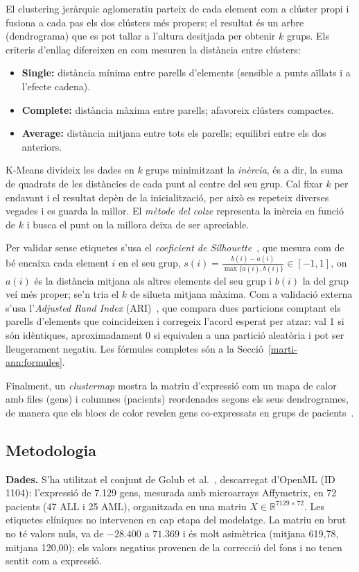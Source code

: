 \documentclass[a4paper,11pt]{article}
\begin{document}
El clustering jeràrquic aglomeratiu parteix de cada element com a clúster propi i fusiona a cada pas els dos clústers més propers; el resultat és un arbre (dendrograma) que es pot tallar a l'altura desitjada per obtenir $k$ grups. Els criteris d'enllaç difereixen en com mesuren la distància entre clústers:
\begin{itemize}
  \item \textbf{Single:} distància mínima entre parells d'elements (sensible a punts aïllats i a l'efecte cadena).
  \item \textbf{Complete:} distància màxima entre parells; afavoreix clústers compactes.
  \item \textbf{Average:} distància mitjana entre tots els parells; equilibri entre els dos anteriors.
\end{itemize}
K-Means divideix les dades en $k$ grups minimitzant la \emph{inèrcia}, és a dir, la suma de quadrats de les distàncies de cada punt al centre del seu grup. Cal fixar $k$ per endavant i el resultat depèn de la inicialització, per això es repeteix diverses vegades i es guarda la millor. El \emph{mètode del colze} representa la inèrcia en funció de $k$ i busca el punt on la millora deixa de ser apreciable.

Per validar sense etiquetes s'usa el \emph{coeficient de Silhouette}~\cite{rousseeuw}, que mesura com de bé encaixa cada element $i$ en el seu grup, $s(i)=\frac{b(i)-a(i)}{\max\{a(i),b(i)\}}\in[-1,1]$, on $a(i)$ és la distància mitjana als altres elements del seu grup i $b(i)$ la del grup veí més proper; se'n tria el $k$ de silueta mitjana màxima. Com a validació externa s'usa l'\emph{Adjusted Rand Index} (ARI)~\cite{hubert}, que compara dues particions comptant els parells d'elements que coincideixen i corregeix l'acord esperat per atzar: val 1 si són idèntiques, aproximadament 0 si equivalen a una partició aleatòria i pot ser lleugerament negatiu. Les fórmules completes són a la Secció~\ref{marti-ann:formules}.

Finalment, un \emph{clustermap} mostra la matriu d'expressió com un mapa de calor amb files (gens) i columnes (pacients) reordenades segons els seus dendrogrames, de manera que els blocs de color revelen gens co-expressats en grups de pacients~\cite{eisen}.

\subsection{Metodologia}

\textbf{Dades.} S'ha utilitzat el conjunt de Golub et al.~\cite{golub}, descarregat d'OpenML (ID 1104): l'expressió de 7.129 gens, mesurada amb microarrays Affymetrix, en 72 pacients (47 ALL i 25 AML), organitzada en una matriu $X\in\mathbb{R}^{7129\times 72}$. Les etiquetes clíniques no intervenen en cap etapa del modelatge. La matriu en brut no té valors nuls, va de $-28.400$ a $71.369$ i és molt asimètrica (mitjana 619,78, mitjana 120,00); els valors negatius provenen de la correcció del fons i no tenen sentit com a expressió.
\end{document}
